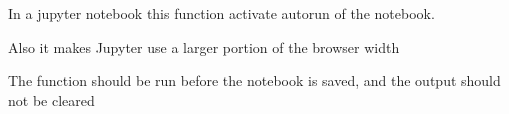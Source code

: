 \documentclass[letterpaper,10pt,english]{sphinxmanual}
\begin{document}
\begin{fulllineitems}
\begin{fulllineitems}
\label{\detokenize{core/modelclass:modelclass.Display_Mixin.scroll_on}}
\pysigstartsignatures
{}
\pysigstopsignatures
\end{fulllineitems}


\begin{fulllineitems}
\label{\detokenize{core/modelclass:modelclass.Display_Mixin.modelflow_auto}}
\pysigstartsignatures
{}
\pysigstopsignatures
\sphinxAtStartPar
In a jupyter notebook this function activate autorun of the notebook.

\sphinxAtStartPar
Also it makes Jupyter use a larger portion of the browser width

\sphinxAtStartPar
The function should be run before the notebook is saved, and the output should not be cleared

\end{fulllineitems}


\end{fulllineitems}

\end{document}
